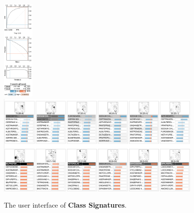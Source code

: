 \begin{figure}[b!]
\centering
\includegraphics[height=13.5em]{figs/class_signatures/three_sides} %
\includegraphics[height=13.5em]{figs/class_signatures/class_signatures_only_no_side} %
\caption{
The user interface of \textbf{Class Signatures}.
}
\label{figs:class_signatures_overview}
\end{figure}